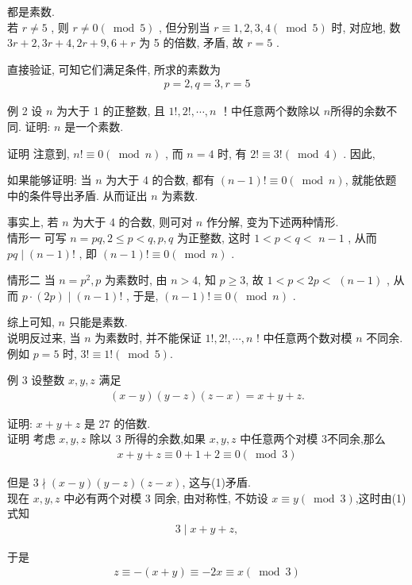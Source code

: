 	都是素数. \\
	若 $r \neq 5$ , 则 $r \neq 0(\bmod 5)$ , 但分别当 $r \equiv 1,2,3,4(\bmod 5)$ 时, 对应地, 数 $3 r+2,3 r+4,2 r+9,6+r$ 为 5 的倍数, 矛盾, 故 $r=5$ .

	直接验证, 可知它们满足条件, 所求的素数为
	\begin{align*}
		p=2, q=3, r=5
	\end{align*}

	例 2 设 $n$ 为大于 1 的正整数, 且 $1!, 2!, \cdots, n$ ！中任意两个数除以 $n$所得的余数不同. 证明: $n$ 是一个素数.

	证明 注意到,  $n!\equiv 0(\bmod n)$ , 而 $n=4$ 时, 有 $2!\equiv 3!(\bmod 4)$ . 因此,

	如果能够证明: 当 $n$ 为大于 4 的合数, 都有 $(n-1)!\equiv 0(\bmod n)$, 就能依题中的条件导出矛盾. 从而证出 $n$ 为素数.

	事实上, 若 $n$ 为大于 4 的合数, 则可对 $n$ 作分解, 变为下述两种情形.\\
	情形一 可写 $n=p q, 2 \leqslant p<q, p, q$ 为正整数, 这时 $1<p<q<$ $n-1$ , 从而 $p q \mid(n-1)!$ , 即 $(n-1)!\equiv 0(\bmod n)$ .

	情形二 当 $n=p^{2}, p$ 为素数时, 由 $n>4$, 知 $p \geqslant 3$, 故 $1<p<2 p<$ $(n-1)$ , 从而 $p \cdot(2 p) \mid(n-1)!$ , 于是,  $(n-1)!\equiv 0(\bmod n)$ .

	综上可知, $n$ 只能是素数.\\
	说明反过来, 当 $n$ 为素数时, 并不能保证 $1!, 2!, \cdots, n$ ! 中任意两个数对模 $n$ 不同余. 例如 $p=5$ 时, $3!\equiv 1!(\bmod 5)$.

	例 3 设整数 $x ,  y ,  z$ 满足
	\begin{align*}
		(x-y)(y-z)(z-x)=x+y+z .
	\end{align*}

	证明: $x+y+z$ 是 27 的倍数.\\
	证明 考虑 $x, y, z$ 除以 3 所得的余数,如果 $x, y, z$ 中任意两个对模 3不同余,那么
	\begin{align*}
		x+y+z \equiv 0+1+2 \equiv 0(\bmod 3)
	\end{align*}

	但是 $3 \nmid(x-y)(y-z)(z-x)$, 这与(1)矛盾. \\
	现在 $x ,  y ,  z$ 中必有两个对模 3 同余, 由对称性, 不妨设 $x \equiv y(\bmod 3)$,这时由(1)式知
	\begin{align*}
		3 \mid x+y+z,
	\end{align*}

	于是
	\begin{align*}
		z \equiv-(x+y) \equiv-2 x \equiv x(\bmod 3)
	\end{align*}

